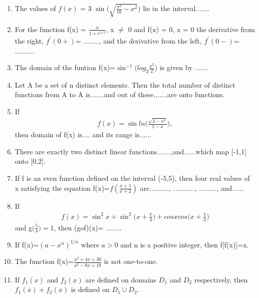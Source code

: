 \renewcommand{\theequation}{\theenumi}
\begin{enumerate}[label=\arabic*.,ref=\thesubsection.\theenumi]

\item The values of $f(x)$ = 3 $\sin\Bigg(\sqrt{\frac{\pi^2}{16}-x^2}\Bigg)$ lie in the interval.......

\item For the function f(x) = $\frac{x}{1+e^{1/x}}$, x $\neq$ 0 and f(x) = 0, x = 0
the derivative from the right, $f^{'}(0+)$= ........, and the derivative from the left, $f^{'}(0-)$= ..........

\item The domain of the funtion f(x)=$\sin^{-1}\Big(log_2\frac{x^2}{2}\Big)$ is given by .......

\item Let A be a set of n distinct elements. Then the total number of distinct functions from A to A is.......and out of these.......are onto functions.

\item If 
\begin{align*}
f(x) = \sin ln\Big(\frac{\sqrt{4 - x^{2}}}{1-x}\Big),
\end{align*}
then domain of f(x) is.... and its range is......

\item There are exactly two distinct linear functions.......,and......which map [-1,1] onto [0,2].

\item If f is an even function defined on the interval (-5,5), then four real values of x satisfying the equation f(x)=$f(\frac{x+1}{x+2})$ are.........., ..........., ........., and......

\item If
\begin{align*}
 f(x)= \sin^{2}x + \sin^{2} \Big(x+\frac{\pi}{3}\Big) + cosxcos\Big(x+\frac{\pi}{3}\Big)
\end{align*}
and g$\big(\frac{5}{4}\big)=1$, then (gof)(x)= ........

\item If f(x)=$(a-x^{n})^{1/n}$ where $a > 0$ and n is a positive integer, then f[f(x)]=x.

\item The function f(x)=$\frac{x^{2}+4x+30}{x^{2}-8x+18}$ is not one-to-one.
                                          
\item If $f_{1}(x)$ and $f_{2}(x)$ are defined on domains $D_{1}$ and $D_{2}$ respectively, then $f_{1}(x)+ f_{2}(x)$  is defined on $D_{1} \cup D_{2}$.


\end{enumerate}

